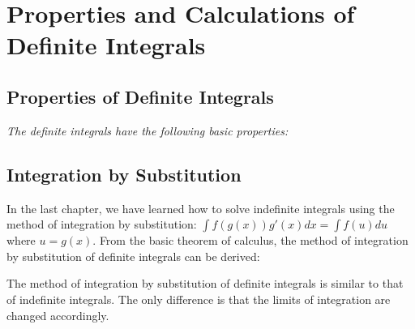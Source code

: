 \newpage



\section{Properties and Calculations of Definite Integrals}

\subsection*{Properties of Definite Integrals}

\noindent \hspace{1.2em}\textit{The definite integrals have the following basic properties:}

\begin{center}
\end{center}
\begin{center}
\end{center}
\begin{center}
\end{center}



\subsection*{Integration by Substitution}

In the last chapter, we have learned how to solve indefinite integrals using
the method of integration by substitution: $\displaystyle\int f(g(x))g'(x)dx =
    \int f(u)du$ where $u = g(x)$. From the basic theorem of calculus, the method
of integration by substitution of definite integrals can be derived:
\begin{center}
\end{center}
\vspace{0.9em}
The method of integration by substitution of definite integrals is similar to
that of indefinite integrals. The only difference is that the limits of
integration are changed accordingly.

